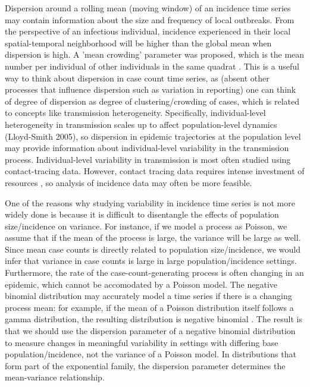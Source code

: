\documentclass[10pt,letterpaper]{article}
\begin{document}
Dispersion around a rolling mean (moving window) of an incidence time series may contain information about the size and frequency of local outbreaks. 
From the perspective of an infectious individual, incidence experienced in their local spatial-temporal neighborhood will be higher than the global mean when dispersion is high. 
A 'mean crowding' parameter was proposed, which is the mean number per individual of other individuals in the same quadrat \cite{lloyd_mean_1967}. 
This is a useful way to think about dispersion in case count time series, as (absent other processes that influence dispersion such as variation in reporting) one can think of degree of dispersion as degree of clustering/crowding of cases, which is related to concepts like transmission heterogeneity. 
Specifically, individual-level heterogeneity in transmission scales up to affect population-level dynamics (Lloyd-Smith 2005), so dispersion in epidemic trajectories at the population level may provide information about individual-level variability in the transmission process. 
Individual-level variability in transmission is most often studied using contact-tracing data. 
However, contact tracing data requires intense investment of resources \cite{kretzschmar_impact_2020}, so analysis of incidence data may often be more feasible. 

One of the reasons why studying variability in incidence time series is not more widely done is because it is difficult to disentangle the effects of population size/incidence on variance. 
For instance, if we model a process as Poisson, we assume that if the mean of the process is large, the variance will be large as well. 
Since mean case counts is directly related to population size/incidence, we would infer that variance in case counts is large in large population/incidence settings. 
Furthermore, the rate of the case-count-generating process is often changing in an epidemic, which cannot be accomodated by a Poisson model. 
The negative binomial distribution may accurately model a time series if there is a changing process mean: for example, if the mean of a Poisson distribution itself follows a gamma distribution, the resulting distribution is negative binomial \cite{cook_notes_nodate}. 
The result is that we should use the dispersion parameter of a negative binomial distribution to measure changes in meaningful variability in settings with differing base population/incidence, not the variance of a Poisson model. 
In distributions that form part of the exponential family, the dispersion parameter determines the mean-variance relationship. 
\end{document}
